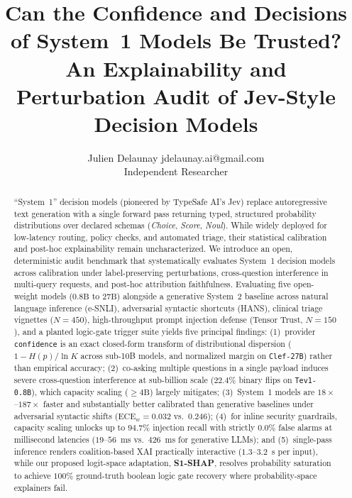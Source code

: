 \documentclass[10pt]{article}
\title{Can the Confidence and Decisions of System~1 Models Be Trusted? An Explainability and Perturbation Audit of Jev-Style Decision Models}
\author{\name Julien Delaunay \email jdelaunay.ai@gmail.com \\
      \addr Independent Researcher}
\begin{document}
\maketitle

\begin{abstract}
``System~1'' decision models (pioneered by TypeSafe AI's Jev) replace autoregressive text generation with a single forward pass returning typed, structured probability distributions over declared schemas (\emph{Choice}, \emph{Score}, \emph{Noul}).
While widely deployed for low-latency routing, policy checks, and automated triage, their statistical calibration and post-hoc explainability remain uncharacterized.
We introduce an open, deterministic audit benchmark that systematically evaluates System~1 decision models across calibration under label-preserving perturbations, cross-question interference in multi-query requests, and post-hoc attribution faithfulness.
Evaluating five open-weight models ($0.8\text{B}$ to $27\text{B}$) alongside a generative System~2 baseline across natural language inference (e-SNLI), adversarial syntactic shortcuts (HANS), clinical triage vignettes ($N=450$), high-throughput prompt injection defense (Tensor Trust, $N=150$), and a planted logic-gate trigger suite yields five principal findings:
(1)~provider \texttt{confidence} is an exact closed-form transform of distributional dispersion ($1 - H(p)/\ln K$ across sub-10B models, and normalized margin on \texttt{Clef-27B}) rather than empirical accuracy;
(2)~co-asking multiple questions in a single payload induces severe cross-question interference at sub-billion scale ($22.4\%$ binary flips on \texttt{Tev1-0.8B}), which capacity scaling ($\ge 4\text{B}$) largely mitigates;
(3)~System~1 models are $18\times$--$187\times$ faster and substantially better calibrated than generative baselines under adversarial syntactic shifts ($\text{ECE}_w = 0.032$ vs.\ $0.246$);
(4)~for inline security guardrails, capacity scaling unlocks up to $94.7\%$ injection recall with strictly $0.0\%$ false alarms at millisecond latencies ($19$--$56$~ms vs.\ $426$~ms for generative LLMs); and
(5)~single-pass inference renders coalition-based XAI practically interactive ($1.3$--$3.2$~s per input), while our proposed logit-space adaptation, \textbf{S1-SHAP}, resolves probability saturation to achieve $100\%$ ground-truth boolean logic gate recovery where probability-space explainers fail.
\end{abstract}
\end{document}
